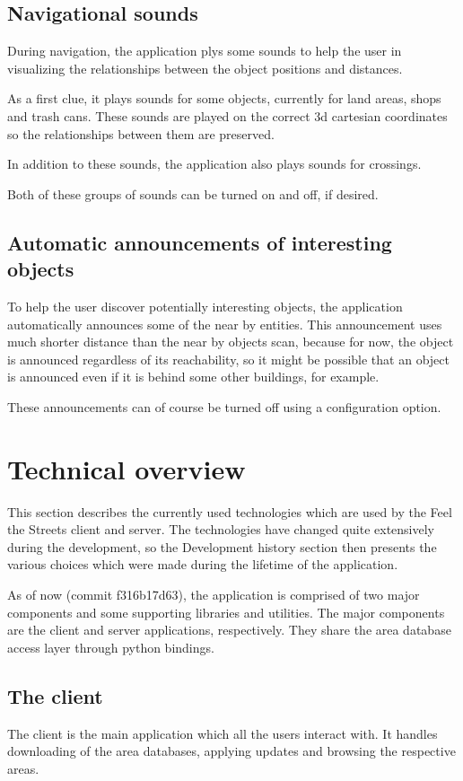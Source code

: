 \documentclass[nolof,digital]{fithesis3}
\begin{document}
\subsection{Navigational sounds}
During navigation, the application plys some sounds to help the user in visualizing the relationships between the object positions and distances.

As a first clue, it plays sounds for some objects, currently for land areas, shops and trash cans. These sounds are played on the correct 3d cartesian coordinates so the relationships between them are preserved.

In addition to these sounds, the application also plays sounds for crossings.

Both of these groups of sounds can be turned on and off, if desired.
\subsection{Automatic announcements of interesting objects}
To help the user discover potentially interesting objects, the application automatically announces some of the near by entities. This announcement uses much shorter distance than the near by objects scan, because for now, the object is announced regardless of its reachability, so it might be possible that an object is announced even if it is behind some other buildings, for example.

These announcements can of course be turned off using a configuration option.
\section{Technical overview}
This section describes the currently used technologies which are used by the Feel the Streets client and server. The technologies have changed quite extensively during the development, so the Development history section then presents the various choices which were made during the lifetime of the application.

As of now (commit f316b17d63), the application is comprised of two major components and some supporting libraries and utilities. The major components are the client and server applications, respectively. They share the area database access layer through python bindings.
\subsection{The client}
The client is the main application which all the users interact with. It handles downloading of the area databases, applying updates and browsing the respective areas.
\end{document}
